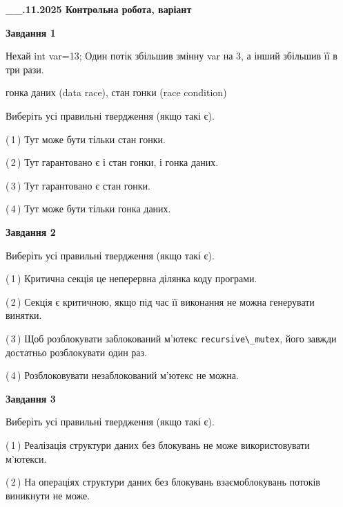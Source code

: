\documentclass[12pt, ukrainian]{article}
\def\code#1{\Verb!#1!}
\begin{document}
\begin {large}

\textbf{\_\_.11.2025 Контрольна робота, варіант  }\par


{

\begin{center}
\textbf{Завдання 1}
\end{center}
Нехай int var=13; Один потік збільшив змінну var на 3, а інший збільшив її в три рази.

гонка даних (data race), стан гонки (race condition)

Виберіть усі правильні твердження (якщо такі є).\par
\vspace{2mm}
(\,1\,) Тут може бути тільки стан гонки.%

(\,2\,) Тут гарантовано є і стан гонки, і гонка даних.%

(\,3\,) Тут гарантовано є стан гонки.%

(\,4\,) Тут може бути тільки гонка даних.%



\begin{center}
\textbf{Завдання 2}
\end{center}
Виберіть усі правильні твердження (якщо такі є).\par
\vspace{2mm}

(\,1\,) Критична секція це неперервна ділянка коду програми.%

(\,2\,) Секція є критичною, якщо під час її виконання не можна генерувати винятки.%

(\,3\,) Щоб розблокувати заблокований м’ютекс \code{recursive\_mutex}, його завжди достатньо розблокувати один раз.%

(\,4\,) Розблоковувати незаблокований м’ютекс не можна.%



\begin{center}
\textbf{Завдання 3}
\end{center}
Виберіть усі правильні твердження (якщо такі є).\par
\vspace{2mm}

(\,1\,) Реалізація структури даних без блокувань не може використовувати м’ютекси.%

(\,2\,) На операціях структури даних без блокувань взаємоблокувань потоків виникнути не може.%

}
\end{large}
\end{document}
